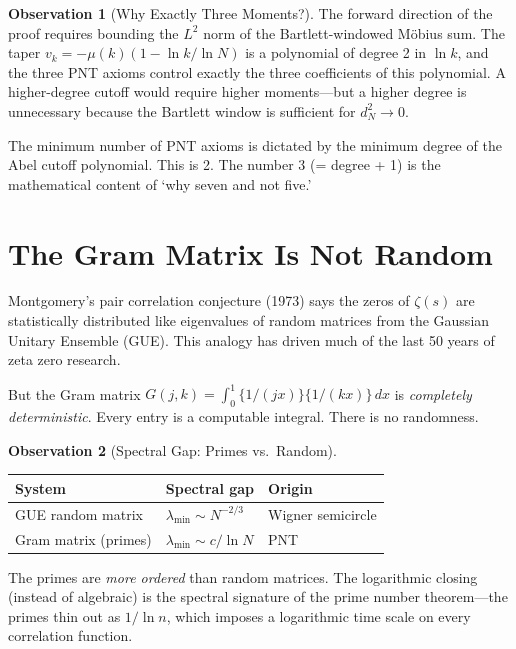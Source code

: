 \documentclass[11pt,a4paper]{article}
\theoremstyle{definition}
\newtheorem{observation}{Observation}[section]
\newcommand{\fract}[1]{\{#1\}}
\begin{document}
\begin{observation}[Why Exactly Three Moments?]
The forward direction of the proof requires bounding the $L^2$ norm
of the Bartlett-windowed M\"obius sum. The taper
$v_k = -\mu(k)(1 - \ln k / \ln N)$ is a polynomial of degree 2 in
$\ln k$, and the three PNT axioms control exactly the three
coefficients of this polynomial. A higher-degree cutoff would require
higher moments---but a higher degree is unnecessary because the
Bartlett window is sufficient for $d_N^2 \to 0$.

The minimum number of PNT axioms is dictated by the minimum degree
of the Abel cutoff polynomial. This is 2. The number 3 (= degree + 1)
is the mathematical content of `why seven and not five.'
\end{observation}

\section{The Gram Matrix Is Not Random}
\label{sec:random}

Montgomery's pair correlation conjecture (1973) says the zeros of
$\zeta(s)$ are statistically distributed like eigenvalues of random
matrices from the Gaussian Unitary Ensemble (GUE). This analogy has
driven much of the last 50 years of zeta zero research.

But the Gram matrix $G(j,k) = \int_0^1 \fract{1/(jx)}\fract{1/(kx)}\,dx$
is \emph{completely deterministic}. Every entry is a computable integral.
There is no randomness.

\begin{observation}[Spectral Gap: Primes vs.\ Random]
\begin{center}
\begin{tabular}{@{}lll@{}}
\toprule
\textbf{System} & \textbf{Spectral gap} & \textbf{Origin} \\
\midrule
GUE random matrix & $\lambda_{\min} \sim N^{-2/3}$ & Wigner semicircle \\
Gram matrix (primes) & $\lambda_{\min} \sim c / \ln N$ & PNT \\
\bottomrule
\end{tabular}
\end{center}

The primes are \emph{more ordered} than random matrices. The
logarithmic closing (instead of algebraic) is the spectral signature
of the prime number theorem---the primes thin out as $1/\ln n$,
which imposes a logarithmic time scale on every correlation function.
\end{observation}
\end{document}
